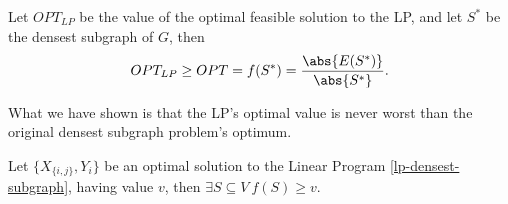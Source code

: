 \begin{cor}
    Let $OPT_{LP}$ be the value of the optimal feasible solution to the LP, and let $S^*$ be the densest subgraph of $G$, then
    \begin{equation}
        OPT_{LP} \geq OPT = f(S^*) = \frac{\abs{E(S^*)}}{\abs{S^*}}.
    \end{equation}
    
    What we have shown is that the LP's optimal value is never worst than the original densest subgraph problem's optimum.
\end{cor}

\begin{lem}\label{l:dsp-geq-lp}
    Let $\{X_{\{i, j\}}, Y_i\}$ be an optimal solution to the Linear Program \ref{lp-densest-subgraph}, having value $v$, then $\exists S \subseteq V\ f(S) \geq v$.
\end{lem}
